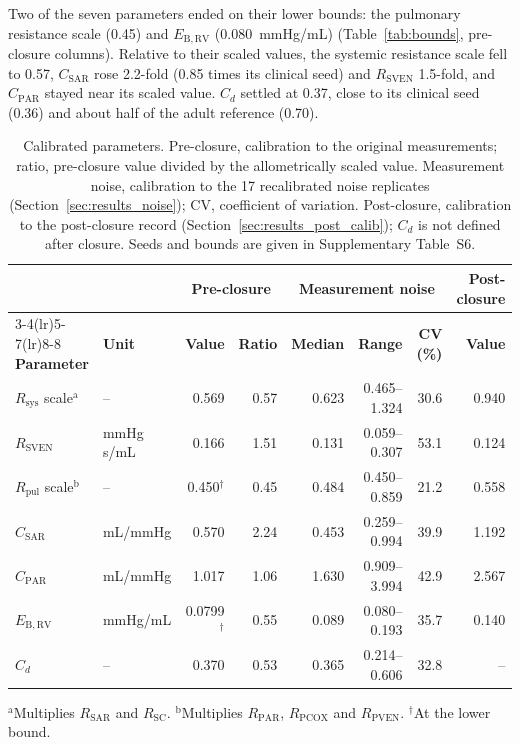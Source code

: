 Two of the seven parameters ended on their lower bounds: the pulmonary resistance scale (0.45) and $E_{\mathrm{B,RV}}$ (0.080~mmHg/mL) (Table~\ref{tab:bounds}, pre-closure columns). Relative to their scaled values, the systemic resistance scale fell to 0.57, $C_{\mathrm{SAR}}$ rose 2.2-fold (0.85 times its clinical seed) and $R_{\mathrm{SVEN}}$ 1.5-fold, and $C_{\mathrm{PAR}}$ stayed near its scaled value. $C_d$ settled at 0.37, close to its clinical seed (0.36) and about half of the adult reference (0.70).

\begin{table}[!htbp]
\centering\small
\setlength{\tabcolsep}{4pt}
\caption{Calibrated parameters. Pre-closure, calibration to the original measurements; ratio, pre-closure value divided by the allometrically scaled value. Measurement noise, calibration to the 17 recalibrated noise replicates (Section~\ref{sec:results_noise}); CV, coefficient of variation. Post-closure, calibration to the post-closure record (Section~\ref{sec:results_post_calib}); $C_d$ is not defined after closure. Seeds and bounds are given in Supplementary Table~S6.}
\label{tab:bounds}\label{tab:post_calib_params}\label{tab:noise_params}
\begin{tabular}{llrrrrrr}
\toprule
 & & \multicolumn{2}{c}{\textbf{Pre-closure}} & \multicolumn{3}{c}{\textbf{Measurement noise}} & \textbf{Post-closure} \\
\cmidrule(lr){3-4}\cmidrule(lr){5-7}\cmidrule(lr){8-8}
\textbf{Parameter} & \textbf{Unit} & \textbf{Value} & \textbf{Ratio} & \textbf{Median} & \textbf{Range} & \textbf{CV (\%)} & \textbf{Value} \\
\midrule
$R_{\mathrm{sys}}$ scale$^{\mathrm{a}}$ & -- & 0.569 & 0.57 & 0.623 & 0.465--1.324 & 30.6 & 0.940 \\
$R_{\mathrm{SVEN}}$ & mmHg\,s/mL & 0.166 & 1.51 & 0.131 & 0.059--0.307 & 53.1 & 0.124 \\
$R_{\mathrm{pul}}$ scale$^{\mathrm{b}}$ & -- & 0.450$^{\dagger}$ & 0.45 & 0.484 & 0.450--0.859 & 21.2 & 0.558 \\
$C_{\mathrm{SAR}}$ & mL/mmHg & 0.570 & 2.24 & 0.453 & 0.259--0.994 & 39.9 & 1.192 \\
$C_{\mathrm{PAR}}$ & mL/mmHg & 1.017 & 1.06 & 1.630 & 0.909--3.994 & 42.9 & 2.567 \\
$E_{\mathrm{B,RV}}$ & mmHg/mL & 0.0799$^{\dagger}$ & 0.55 & 0.089 & 0.080--0.193 & 35.7 & 0.140 \\
$C_d$ & -- & 0.370 & 0.53 & 0.365 & 0.214--0.606 & 32.8 & -- \\
\bottomrule
\end{tabular}
\par\vspace{2pt}
{\footnotesize $^{\mathrm{a}}$Multiplies $R_{\mathrm{SAR}}$ and $R_{\mathrm{SC}}$. $^{\mathrm{b}}$Multiplies $R_{\mathrm{PAR}}$, $R_{\mathrm{PCOX}}$ and $R_{\mathrm{PVEN}}$. $^{\dagger}$At the lower bound.}
\end{table}



